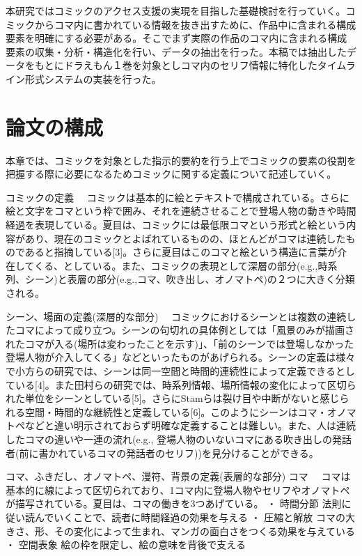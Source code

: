 \documentclass[a4j]{matsushita-zemi}
\begin{document}
本研究ではコミックのアクセス支援の実現を目指した基礎検討を行っていく。コミックからコマ内に書かれている情報を抜き出すために、作品中に含まれる構成要素を明確にする必要がある。そこでまず実際の作品のコマ内に含まれる構成要素の収集・分析・構造化を行い、データの抽出を行った。本稿では抽出したデータをもとにドラえもん１巻を対象としコマ内のセリフ情報に特化したタイムライン形式システムの実装を行った。


\section{論文の構成}
\label{works} 

本章では、コミックを対象とした指示的要約を行う上でコミックの要素の役割を把握する際に必要になるためコミックに関する定義について記述していく。

コミックの定義
　コミックは基本的に絵とテキストで構成されている。さらに絵と文字をコマという枠で囲み、それを連続させることで登場人物の動きや時間経過を表現している。夏目は、コミックには最低限コマという形式と絵という内容があり、現在のコミックとよばれているものの、ほとんどがコマは連続したものであると指摘している[3]。さらに夏目はこのコマと絵という構造に言葉が介在してくる、としている。また、コミックの表現として深層の部分(e.g.,時系列、シーン)と表層の部分(e.g.,コマ、吹き出し、オノマトペ)の２つに大きく分類される。

シーン、場面の定義(深層的な部分)
　コミックにおけるシーンとは複数の連続したコマによって成り立つ。シーンの句切れの具体例としては「風景のみが描画されたコマが入る(場所は変わったことを示す)」、「前のシーンでは登場しなかった登場人物が介入してくる」などといったものがあげられる。シーンの定義は様々で小方らの研究では、シーンは同一空間と時間的連続性によって定義できるとしている[4]。また田村らの研究では、時系列情報、場所情報の変化によって区切られた単位をシーンとしている[5]。さらにStamらは裂け目や中断がないと感じられる空間・時間的な継続性と定義している[6]。このようにシーンはコマ・オノマトペなどと違い明示されておらず明確な定義することは難しい。また、人は連続したコマの違いや一連の流れ(e.g., 登場人物のいないコマにある吹き出しの発話者(前に書かれているコマの発話者のセリフ))を見分けることができる。

コマ、ふきだし、オノマトペ、漫符、背景の定義(表層的な部分)
コマ
　コマは基本的に線によって区切られており、1コマ内に登場人物やセリフやオノマトペが描写されている。夏目は、コマの働きを3つあげている。
・	時間分節
法則に従い読んでいくことで、読者に時間経過の効果を与える
・	圧縮と解放
コマの大きさ、形、その変化によって生まれ、マンガの面白さをつくる効果を与えている
・	空間表象
絵の枠を限定し、絵の意味を背後で支える
\end{document}
